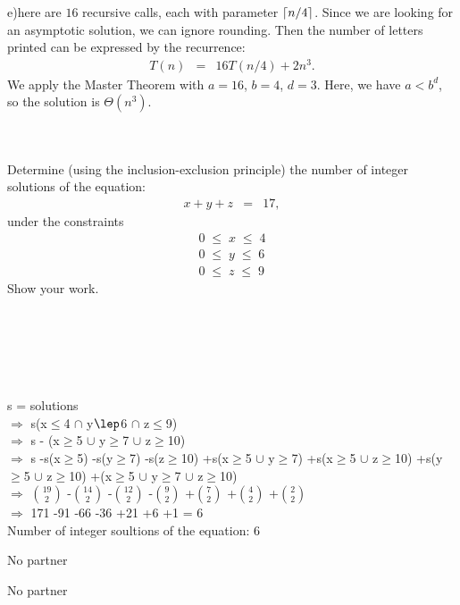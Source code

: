 \documentclass[11pt]{article}
\begin{document}
\begin{solution}
e)here are $16$ recursive calls, each with parameter ${\left\lceil n/4\right\rceil}$. Since
we are looking for an asymptotic solution, we can ignore rounding. Then
the number of letters printed can be expressed by the recurrence:
%
\begin{eqnarray*}
	T(n) &=& 16 T(n/4) + 2n^3.
\end{eqnarray*}
%
We apply the Master Theorem with $a = 16$, $b = 4$, $d = 3$. Here, we
have $a < b^d$, so the solution is $\Theta(n^3)$.\\\\\\


\end{solution}

\pagebreak
\begin{problem}
	Determine (using the inclusion-exclusion principle)
the number of integer solutions of the equation:
%
\begin{eqnarray*}
x + y + z &=& 17,
\end{eqnarray*}
%
under the constraints
%
\begin{eqnarray*}
        0 \;\le\; x \;\le\; 4 \\
        0 \;\le\; y \;\le\; 6 \\
        0\;\le\; z  \;\le\; 9
\end{eqnarray*}
%
Show your work.\\\\\\\\
\end{problem}
\begin{solution}
	\\\\s = solutions
	\\$\Rightarrow$ s(x$\leq$4 $\cap$ y$\lep$6 $\cap$ z$\leq$9)
	\\$\Rightarrow$ s - (x$\geq$5 $\cup$ y$\geq$7 $\cup$ z$\geq$10)
	\\$\Rightarrow$ s -s(x$\geq$5) -s(y$\geq$7) -s(z$\geq$10)
	+s(x$\geq$5 $\cup$ y$\geq$7) +s(x$\geq$5 $\cup$ z$\geq$10)
	+s(y$\geq$5 $\cup$ z$\geq$10) +(x$\geq$5 $\cup$ y$\geq$7 $\cup$ z$\geq$10)
	\\$\Rightarrow$ ${{19}\choose{2}}$ -${{14}\choose{2}}$ -${{12}\choose{2}}$
	-${{9}\choose{2}}$ +${{7}\choose{2}}$ +${{4}\choose{2}}$ +${{2}\choose{2}}$
	\\$\Rightarrow$ 171 -91 -66 -36 +21 +6 +1 = 6
	\\Number of integer soultions of the equation: 6
\end{solution}

\pagebreak
\begin{problem}
 	No partner
\end{problem}


\begin{solution}
	No partner
\end{solution}
\end{document}
